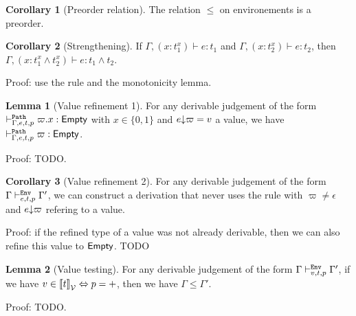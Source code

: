 \documentclass[a4paper]{article}
\theoremstyle{definition}
\newtheorem{lemma}{Lemma}
\newtheorem{corollary}{Corollary}
\begin{document}
        \begin{corollary}[Preorder relation]
          The relation $\leq$ on environements is a preorder.
        \end{corollary}
    
        \begin{corollary}[Strengthening]
          If $\Gamma, (x:t_1^x) \vdash e:t_1$ and $\Gamma, (x:t_2^x) \vdash e:t_2$, then
          $\Gamma, (x:t_1^x \land t_2^x) \vdash e:t_1\land t_2$.
        \end{corollary}
        Proof: use the  rule and the monotonicity lemma.

        \begin{lemma}[Value refinement 1]
          For any derivable judgement of the form $\pvdash \Gamma p e t \varpi.x:\Empty$ with $x\in\{0,1\}$ and $\occ e \varpi = v$ a value,
          we have $\pvdash \Gamma p e t \varpi:\Empty$.
        \end{lemma}
        Proof: TODO.

        \begin{corollary}[Value refinement 2]
          For any derivable judgement of the form $\Gamma \evdash p e t \Gamma'$, we can construct a derivation that
          never uses the rule  with $\varpi\neq\epsilon$ and $\occ e \varpi$ refering to a value.
        \end{corollary}
        Proof: if the refined type of a value was not already derivable, then we can also refine this value to $\Empty$. TODO

        \begin{lemma}[Value testing]
          For any derivable judgement of the form $\Gamma \evdash p v t \Gamma'$, if we have $v \in \valsemantic{t} \Leftrightarrow p=+$,
          then we have $\Gamma\leq\Gamma'$.
        \end{lemma}
        Proof: TODO.
\end{document}
